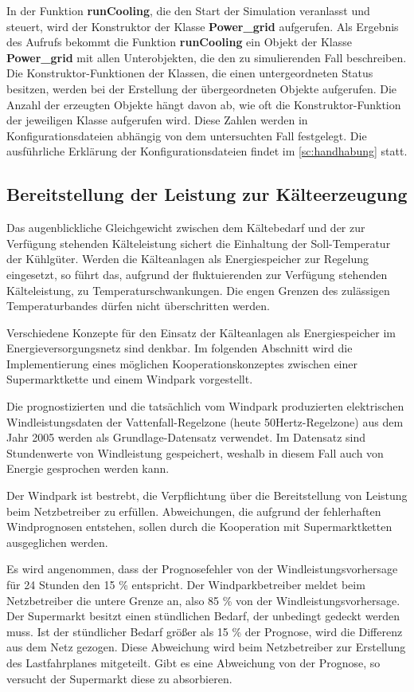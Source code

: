 In der Funktion \textbf{runCooling}, die den Start der Simulation veranlasst und
steuert, wird der Konstruktor der Klasse \textbf{Power\_grid} aufgerufen. Als
Ergebnis des Aufrufs bekommt die Funktion \textbf{runCooling} ein Objekt der
Klasse \textbf{Power\_grid} mit allen Unterobjekten, die den zu simulierenden
Fall beschreiben. Die Konstruktor-Funktionen der Klassen, die einen
untergeordneten Status besitzen, werden bei der Erstellung der \"ubergeordneten
Objekte aufgerufen. Die Anzahl der erzeugten Objekte h\"angt davon ab, wie oft
die Konstruktor-Funktion der jeweiligen Klasse aufgerufen wird. Diese Zahlen
werden in Konfigurationsdateien abh\"angig von dem untersuchten Fall festgelegt.
Die ausf\"uhrliche Erkl\"arung der Konfigurationsdateien findet im
\cref{sc:handhabung} statt.

\subsection*{Bereitstellung der Leistung zur K\"alteerzeugung}

Das augenblickliche Gleichgewicht zwischen dem K\"altebedarf und der zur
Verf\"ugung stehenden K\"alteleistung sichert die Einhaltung der Soll-Temperatur
der K\"uhlg\"uter. Werden die K\"alteanlagen als Energiespeicher zur Regelung
eingesetzt, so f\"uhrt das, aufgrund der fluktuierenden zur Verf\"ugung
stehenden K\"alteleistung, zu Temperaturschwankungen. Die engen Grenzen des
zul\"assigen Temperaturbandes d\"urfen nicht \"uberschritten werden.

Verschiedene Konzepte f\"ur den Einsatz der K\"alteanlagen als Energiespeicher
im Energieversorgungsnetz sind denkbar. Im folgenden Abschnitt wird die
Implementierung eines m\"oglichen Kooperationskonzeptes zwischen einer
Supermarktkette und einem Windpark vorgestellt.

Die prognostizierten und die tatsächlich vom Windpark produzierten elektrischen
Windleistungsdaten der Vattenfall-Regelzone (heute 50Hertz-Regelzone) aus dem
Jahr 2005 werden als Grundlage-Datensatz verwendet. Im Datensatz sind
Stundenwerte von Windleistung gespeichert, weshalb in diesem Fall auch von
Energie gesprochen werden kann.

Der Windpark ist bestrebt, die Verpflichtung \"uber die Bereitstellung von
Leistung beim Netzbetreiber zu erf\"ullen. Abweichungen, die aufgrund der
fehlerhaften Windprognosen entstehen, sollen durch die Kooperation mit
Supermarktketten ausgeglichen werden.

Es wird angenommen, dass der Prognosefehler von der Windleistungsvorhersage
f\"ur 24 Stunden den 15 \% entspricht. Der Windparkbetreiber meldet beim
Netzbetreiber die untere Grenze an, also 85 \% von der Windleistungsvorhersage.
Der Supermarkt besitzt einen st\"undlichen Bedarf, der unbedingt gedeckt werden
muss. Ist der st\"undlicher Bedarf gr\"o\ss er als 15 \% der Prognose, wird die
Differenz aus dem Netz gezogen. Diese Abweichung wird beim Netzbetreiber zur
Erstellung des Lastfahrplanes mitgeteilt. Gibt es eine Abweichung von der
Prognose, so versucht der Supermarkt diese zu absorbieren.

